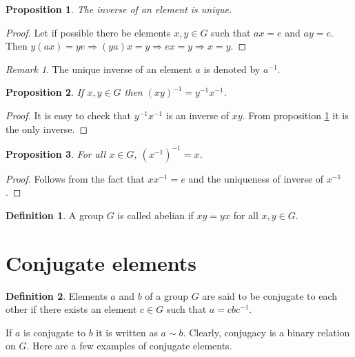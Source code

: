 \documentclass{article}
\theoremstyle{plain}
\numberwithin{thm}{section}
\theoremstyle{plain}
\newtheorem{prop}{Proposition}
\numberwithin{prop}{section}
\theoremstyle{definition}
\newtheorem{defn}{Definition}
\numberwithin{defn}{section}
\theoremstyle{remark}
\newtheorem*{rem}{Remark}
\numberwithin{equation}{section}
\begin{document}
\begin{prop}\label{s1p3}
The inverse of an element is unique.
\end{prop}
\begin{proof}
Let if possible there be elements $x, y \in G$ such that $ax = e$ and $ay = e$.
Then $y(ax) = ye \Rightarrow (ya)x = y \Rightarrow ex = y \Rightarrow x = y$.
\end{proof}

\begin{rem}
The unique inverse of an element $a$ is denoted by $a^{-1}$.
\end{rem}

\begin{prop}\label{s1p4}
If $x, y \in G$ then $(xy)^{-1} = y^{-1}x^{-1}$.
\end{prop}
\begin{proof}
It is easy to check that $y^{-1}x^{-1}$ is an inverse of $xy$. From proposition
\ref{s1p3} it is the only inverse.
\end{proof}

\begin{prop}\label{s1p5}
For all $x \in G$, $(x^{-1})^{-1} = x$.
\end{prop}
\begin{proof}
Follows from the fact that $xx^{-1} = e$ and the uniqueness of inverse of 
$x^{-1}$.
\end{proof}

\begin{defn}\label{s1d2}
A group $G$ is called abelian if $xy = yx$ for all $x, y \in G$.
\end{defn}

\section{Conjugate elements}\label{s2}
\begin{defn}\label{s2d1}
Elements $a$ and $b$ of a group $G$ are said to be conjugate to each other
if there exists an element $c \in G$ such that $a = cbc^{-1}$. 
\end{defn}

If $a$ is conjugate to $b$ it is written as $a \sim b$. Clearly, conjugacy is
a binary relation on $G$. Here are a few examples of conjugate elements.
\end{document}

